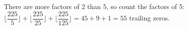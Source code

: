 There are more factors of 2 than 5, so count the factors of 5: $\lfloor\dfrac{225}{5}\rfloor+\lfloor\dfrac{225}{25}\rfloor+\lfloor\dfrac{225}{125}\rfloor=45+9+1=\boxed{55}$ trailing zeros.
